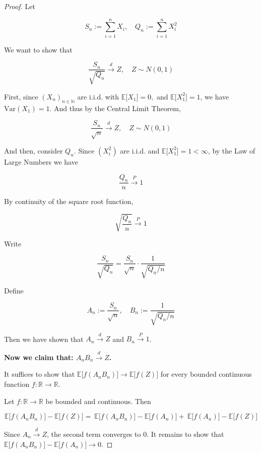 \documentclass{qlnotes-export}
\begin{document}
\begin{proof}

Let

\[S_{n} := \sum\limits_{i = 1}^{n}X_{i},\quad Q_{n} := \sum\limits_{i = 1}^{n}X_{i}^{2}\]

We want to show that

\[\frac{S_{n}}{\sqrt{Q_{n}}}\overset{d}{\rightarrow}Z,\quad Z \sim N(0,1)\]

First, since \((X_{n})_{n \in {\mathbb{N}}}\) are i.i.d. with \({\mathbb{E}}\lbrack X_{1}\rbrack = 0,\) and \({\mathbb{E}}\lbrack X_{1}^{2}\rbrack = 1\), we have \(\text{Var}(X_{1}) = 1\). And thus by the Central Limit Theorem,

\[\frac{S_{n}}{\sqrt{n}}\overset{d}{\rightarrow}Z,\quad Z \sim N(0,1)\]

And then, consider \(Q_{n}\). Since \((X_{i}^{2})\) are i.i.d. and \({\mathbb{E}}\lbrack X_{1}^{2}\rbrack = 1 < \infty\), by the Law of Large Numbers we have

\[\frac{Q_{n}}{n}\overset{P}{\rightarrow}1\]

By continuity of the square root function,

\[\sqrt{\frac{Q_{n}}{n}}\overset{P}{\rightarrow}1\]

Write

\[\frac{S_{n}}{\sqrt{Q_{n}}} = \frac{S_{n}}{\sqrt{n}} \cdot \frac{1}{\sqrt{Q_{n}/n}}\]

Define

\[A_{n} := \frac{S_{n}}{\sqrt{n}},\quad B_{n} := \frac{1}{\sqrt{Q_{n}/n}}\]

Then we have shown that \(A_{n}\overset{d}{\rightarrow}Z\) and \(B_{n}\overset{P}{\rightarrow}1\).

\textbf{Now we claim that: \(A_{n}B_{n}\overset{d}{\rightarrow}Z\).}

It suffices to show that \({\mathbb{E}}\lbrack f(A_{n}B_{n})\rbrack\rightarrow{\mathbb{E}}\lbrack f(Z)\rbrack\) for every bounded continuous function \(f:{\mathbb{R}}\rightarrow{\mathbb{R}}\).

Let \(f:{\mathbb{R}}\rightarrow{\mathbb{R}}\) be bounded and continuous. Then

\[{\mathbb{E}}\lbrack f(A_{n}B_{n})\rbrack - {\mathbb{E}}\lbrack f(Z)\rbrack = \ {\mathbb{E}}\lbrack f(A_{n}B_{n})\rbrack - {\mathbb{E}}\lbrack f(A_{n})\rbrack + \ {\mathbb{E}}\lbrack f(A_{n})\rbrack - {\mathbb{E}}\lbrack f(Z)\rbrack\]

Since \(A_{n}\overset{d}{\rightarrow}Z\), the second term converges to \(0\). It remains to show that \({\mathbb{E}}\lbrack f(A_{n}B_{n})\rbrack - {\mathbb{E}}\lbrack f(A_{n})\rbrack\rightarrow 0\).


\end{proof}
\end{document}
